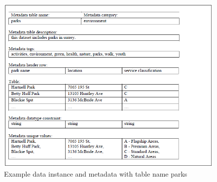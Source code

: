 \begin{figure}
    \centering
    \includegraphics[width=5in]{figures/example-parks.png}
    \caption{Example data instance and metadata with table name parks}
    \label{fig:example-parks}
\end{figure}

